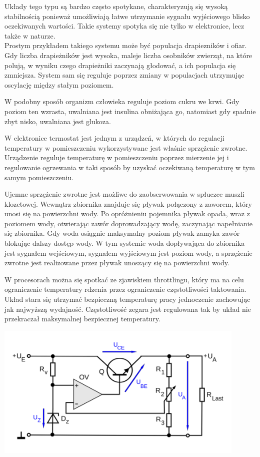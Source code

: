 \documentclass{article}
\begin{document}
\quad Układy tego typu są bardzo często spotykane, charakteryzują się wysoką stabilnością ponieważ umożliwiają łatwe utrzymanie sygnału wyjściowego blisko oczekiwanych wartości. Takie systemy spotyka się nie tylko w elektronice, lecz także w naturze.\\ Prostym przykładem takiego systemu może być populacja drapiezników i ofiar. Gdy liczba drapieżników jest wysoka, maleje liczba osobników zwierząt, na które polują, w wyniku czego drapieżniki zaczynają głodować, a ich populacja się zmniejsza. System sam się reguluje poprzez zmiany w populacjach utrzymując oscylację między stałym poziomem. 

W podobny sposób organizm człowieka reguluje poziom cukru we krwi. 
Gdy poziom ten wzrasta, uwalniana jest insulina obniżająca go, natomiast gdy spadnie zbyt nisko, uwalniana jest glukoza.

W elektronice termostat jest jednym z urządzeń, w których do regulacji temperatury w pomieszczeniu wykorzystywane jest właśnie sprzężenie zwrotne. 
Urządzenie reguluje temperaturę w pomieszczeniu poprzez mierzenie jej i regulowanie ogrzewania w taki sposób by uzyskać oczekiwaną temperaturę w tym samym pomieszczeniu.

Ujemne sprzężenie zwrotne jest możliwe do zaobserwowania w spłuczce muszli klozetowej. Wewnątrz zbiornika 
znajduje się pływak połączony z zaworem, który unosi się na powierzchni wody. Po opróżnieniu pojemnika pływak
opada, wraz z poziomem wody, otwierając zawór doprowadzający wodę, zaczynając napełnianie się zbiornika.
Gdy woda osiągnie maksymalny poziom pływak zamyka zawór blokując dalszy dostęp wody. W tym systemie woda dopływająca
do zbiornika jest sygnałem wejściowym, sygnałem wyjściowym jest poziom wody, a sprzężenie zwrotne jest realizowane
przez pływak unoszący się na powierzchni wody.



W procesorach można się spotkać ze zjawiskiem throttlingu, który ma na celu ograniczenie temperatury rdzenia przez ograniczenie częstotliwości taktowania. 
Układ stara się utrzymać bezpieczną temperaturę pracy jednoczenie zachowując jak najwyższą wydajność. 
Częstotliwość zegara jest regulowana tak by układ nie przekraczał maksymalnej bezpiecznej temperatury.

\includegraphics[width=12cm]{stab.png}
\end{document}
